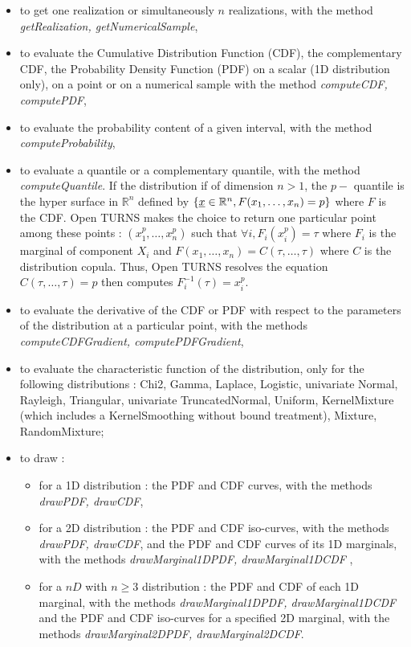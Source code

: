 \begin{itemize}
\item to get one realization or simultaneously $n$ realizations, with the method {\itshape getRealization, getNumericalSample},
\item to evaluate the Cumulative Distribution Function (CDF), the complementary CDF, the Probability Density Function (PDF) on a scalar (1D distribution only), on a point or on a numerical sample with the method {\itshape computeCDF, computePDF},
\item to evaluate the probability content of a given interval, with the method {\itshape computeProbability},
\item to evaluate a quantile or a complementary quantile, with the method {\itshape computeQuantile}. If the distribution if of dimension $n>1$, the $p-$ quantile is the hyper surface in $\mathbb{R}^n$ defined by  $\{{\underline{x}}\in \mathbb{R}^n, F(x_1, \dots, x_n) = p \}$ where $F$ is the CDF. Open TURNS makes the choice to return one particular point among these points : $(x_1^p, \dots, x_n^p)$ such that $\forall i, F_i(x_i^p) =  \tau$ where $F_i$ is the marginal of component $X_i$ and $F(x_1, \dots, x_n) = C(\tau, \dots, \tau)$ where $C$ is the distribution copula. Thus, Open TURNS resolves the equation $ C(\tau, \dots, \tau)=p$ then computes $F_i^{-1}(\tau) = x_i^p$.
\item to evaluate the derivative of the CDF or PDF with respect to the parameters of the distribution at a particular point, with the methods {\itshape computeCDFGradient, computePDFGradient},
\item to evaluate the characteristic function of the distribution, only for the following distributions : Chi2, Gamma, Laplace, Logistic, univariate Normal, Rayleigh, Triangular, univariate TruncatedNormal, Uniform, KernelMixture (which includes a KernelSmoothing without bound treatment), Mixture, RandomMixture;
\item to draw :
  \begin{itemize}
  \item for a 1D distribution : the PDF and CDF curves, with the methods {\itshape drawPDF, drawCDF},
  \item for a 2D distribution : the PDF and CDF iso-curves, with the methods {\itshape drawPDF, drawCDF}, and the PDF and CDF curves of its 1D marginals, with the methods {\itshape drawMarginal1DPDF, drawMarginal1DCDF} ,
  \item for a $nD$ with $n\geq 3$ distribution : the PDF and CDF of each 1D marginal, with the methods {\itshape drawMarginal1DPDF, drawMarginal1DCDF} and the PDF and CDF iso-curves for a specified 2D marginal, with the methods {\itshape drawMarginal2DPDF, drawMarginal2DCDF}.
  \end{itemize}
\end{itemize}

